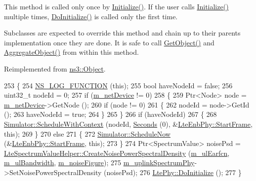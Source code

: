 This method is called only once by \hyperlink{classns3_1_1Object_af4411cb29971772fcd09203474a95078}{Initialize()}. If the user calls \hyperlink{classns3_1_1Object_af4411cb29971772fcd09203474a95078}{Initialize()} multiple times, \hyperlink{classns3_1_1LteEnbPhy_a404572fbc4d6948034038b91bf450877}{Do\+Initialize()} is called only the first time.

Subclasses are expected to override this method and chain up to their parent\textquotesingle{}s implementation once they are done. It is safe to call \hyperlink{classns3_1_1Object_a13e18c00017096c8381eb651d5bd0783}{Get\+Object()} and \hyperlink{classns3_1_1Object_a79dd435d300f3deca814553f561a2922}{Aggregate\+Object()} from within this method. 

Reimplemented from \hyperlink{classns3_1_1Object_af8482a521433409fb5c7f749398c9dbe}{ns3\+::\+Object}.


\begin{DoxyCode}
253 \{
254   \hyperlink{log-macros-disabled_8h_a90b90d5bad1f39cb1b64923ea94c0761}{NS\_LOG\_FUNCTION} (\textcolor{keyword}{this});
255   \textcolor{keywordtype}{bool} haveNodeId = \textcolor{keyword}{false};
256   uint32\_t nodeId = 0;
257   \textcolor{keywordflow}{if} (\hyperlink{classns3_1_1LtePhy_aa26374d08b66fd1d4f5f1f216475052e}{m\_netDevice} != 0)
258     \{
259       Ptr<Node> node = \hyperlink{classns3_1_1LtePhy_aa26374d08b66fd1d4f5f1f216475052e}{m\_netDevice}->GetNode ();
260       \textcolor{keywordflow}{if} (node != 0)
261         \{
262           nodeId = node->GetId ();
263           haveNodeId = \textcolor{keyword}{true};
264         \}
265     \}
266   \textcolor{keywordflow}{if} (haveNodeId)
267     \{
268       \hyperlink{classns3_1_1Simulator_a86dbaef45a15a42365d7d2ae550449f6}{Simulator::ScheduleWithContext} (nodeId, 
      \hyperlink{group__timecivil_ga33c34b816f8ff6628e33d5c8e9713b9e}{Seconds} (0), &\hyperlink{classns3_1_1LteEnbPhy_a92d47dc2fa71c37ecb848fb9ed2ec592}{LteEnbPhy::StartFrame}, \textcolor{keyword}{this});
269     \}
270   \textcolor{keywordflow}{else}
271     \{
272       \hyperlink{classns3_1_1Simulator_a2219ee02c0647adc83d1c918c3256266}{Simulator::ScheduleNow} (&\hyperlink{classns3_1_1LteEnbPhy_a92d47dc2fa71c37ecb848fb9ed2ec592}{LteEnbPhy::StartFrame}, \textcolor{keyword}{this});
273     \}
274   Ptr<SpectrumValue> noisePsd = 
      \hyperlink{classns3_1_1LteSpectrumValueHelper_ac2cb4a9377ea954e990df6914b6dff4e}{LteSpectrumValueHelper::CreateNoisePowerSpectralDensity}
       (\hyperlink{classns3_1_1LtePhy_a6dd4dee212ddb4d07b1f576524e0cc75}{m\_ulEarfcn}, \hyperlink{classns3_1_1LtePhy_ac3eb3231fa82f4f60047b4752507a144}{m\_ulBandwidth}, \hyperlink{classns3_1_1LtePhy_a89b2ff50bd38b68e02924bb9d6d193e2}{m\_noiseFigure});
275   \hyperlink{classns3_1_1LtePhy_addc3110b5a1f7b63c52f4ce8ca59c6cd}{m\_uplinkSpectrumPhy}->SetNoisePowerSpectralDensity (noisePsd);
276   \hyperlink{classns3_1_1Object_af8482a521433409fb5c7f749398c9dbe}{LtePhy::DoInitialize} ();
277 \}
\end{DoxyCode}


